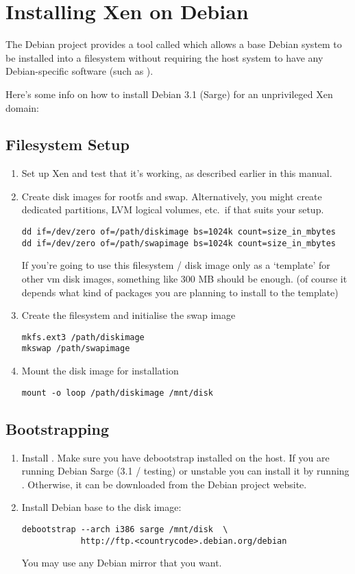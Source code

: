 \chapter{Installing Xen on Debian}

The Debian project provides a tool called  which
allows a base Debian system to be installed into a filesystem without
requiring the host system to have any Debian-specific software (such as
).

Here's some info on how to install Debian 3.1 (Sarge) for an
unprivileged Xen domain:

\section{Filesystem Setup}
\begin{enumerate}
\item Set up Xen and test that it's working, as described earlier in
  this manual.

\item Create disk images for rootfs and swap. Alternatively, you might
  create dedicated partitions, LVM logical volumes, etc.\ if that suits
  your setup.
\begin{verbatim}
dd if=/dev/zero of=/path/diskimage bs=1024k count=size_in_mbytes
dd if=/dev/zero of=/path/swapimage bs=1024k count=size_in_mbytes
\end{verbatim}
  If you're going to use this filesystem / disk image only as a
  `template' for other vm disk images, something like 300 MB should be
  enough. (of course it depends what kind of packages you are planning
  to install to the template)

\item Create the filesystem and initialise the swap image
\begin{verbatim}
mkfs.ext3 /path/diskimage
mkswap /path/swapimage
\end{verbatim}

\item Mount the disk image for installation
\begin{verbatim}
mount -o loop /path/diskimage /mnt/disk
\end{verbatim}
\end{enumerate}
\section{Bootstrapping}
\begin{enumerate}
\item Install . Make sure you have debootstrap
  installed on the host. If you are running Debian Sarge (3.1 / testing)
  or unstable you can install it by running . Otherwise, it can be downloaded from the Debian
  project website.

\item Install Debian base to the disk image:
\begin{verbatim}
debootstrap --arch i386 sarge /mnt/disk  \
            http://ftp.<countrycode>.debian.org/debian
\end{verbatim}
  You may use any Debian mirror that you want.
\end{enumerate}

